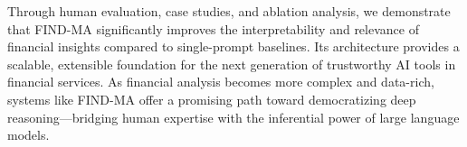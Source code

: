 \documentclass[11pt]{article}
\newcommand{\findma}{\textsc{FIND-MA}}
\begin{document}
Through human evaluation, case studies, and ablation analysis, we demonstrate that \findma{} significantly improves the interpretability and relevance of financial insights compared to single-prompt baselines. Its architecture provides a scalable, extensible foundation for the next generation of trustworthy AI tools in financial services. As financial analysis becomes more complex and data-rich, systems like \findma{} offer a promising path toward democratizing deep reasoning—bridging human expertise with the inferential power of large language models.



\end{document}
